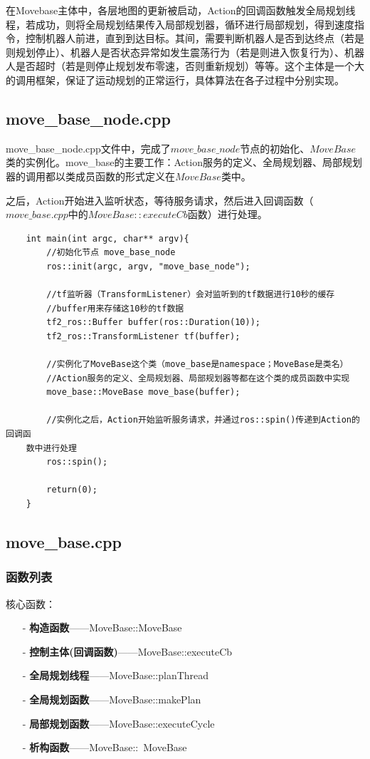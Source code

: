 \documentclass[9pt, oneside]{book}
\begin{document}
在Movebase主体中，各层地图的更新被启动，Action的回调函数触发全局规划线程，若成功，则将全局规划结果传入局部规划器，循环进行局部规划，得到速度指令，控制机器人前进，直到到达目标。其间，需要判断机器人是否到达终点（若是则规划停止）、机器人是否状态异常如发生震荡行为（若是则进入恢复行为）、机器人是否超时（若是则停止规划发布零速，否则重新规划）等等。这个主体是一个大的调用框架，保证了运动规划的正常运行，具体算法在各子过程中分别实现。

\subsection{move\_base\_node.cpp}

move\_base\_node.cpp文件中，完成了$move\_base\_node$节点的初始化、$MoveBase$类的实例化。move\_base的主要工作：Action服务的定义、全局规划器、局部规划器的调用都以类成员函数的形式定义在$MoveBase$类中。

之后，Action开始进入监听状态，等待服务请求，然后进入回调函数（$move\_base.cpp$中的$MoveBase::executeCb$函数）进行处理。

\begin{verbatim}
    int main(int argc, char** argv){
        //初始化节点 move_base_node
        ros::init(argc, argv, "move_base_node");
      
        //tf监听器（TransformListener）会对监听到的tf数据进行10秒的缓存
        //buffer用来存储这10秒的tf数据
        tf2_ros::Buffer buffer(ros::Duration(10));
        tf2_ros::TransformListener tf(buffer);
      
        //实例化了MoveBase这个类（move_base是namespace；MoveBase是类名）
        //Action服务的定义、全局规划器、局部规划器等都在这个类的成员函数中实现
        move_base::MoveBase move_base(buffer);
      
        //实例化之后，Action开始监听服务请求，并通过ros::spin()传递到Action的回调函
    数中进行处理
        ros::spin();
      
        return(0);
    }
\end{verbatim}

\subsection{move\_base.cpp}

\subsubsection{函数列表}

核心函数：
\begin{itemize}
    \item [-] \textbf{构造函数}——MoveBase::MoveBase 
    \item [-] \textbf{控制主体(回调函数)}——MoveBase::executeCb
    \item [-] \textbf{全局规划线程}——MoveBase::planThread
    \item [-] \textbf{全局规划函数}——MoveBase::makePlan
    \item [-] \textbf{局部规划函数}——MoveBase::executeCycle
    \item [-] \textbf{析构函数}——MoveBase::~MoveBase
\end{itemize}
    
\end{document}
